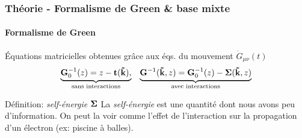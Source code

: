 \begin{frame}
    \frametitle{Théorie - Formalisme de Green \& base mixte}
    \framesubtitle{Formalisme de Green}
    Équations matricielles obtenues grâce aux éqs. du mouvement $\dot{G}_{\mu\nu}(t)$
    \begin{align}
      \underbrace{\vb{G}_0^{-1}(z) = z - \vb{t}(\vb{\tilde{k}}),}_{\text{sans interactions}}
        &&\underbrace{\vb{G}^{-1}(\vb{\Tilde{k}}, z) = \vb{G}_0^{-1}(z) - \vb{\Sigma}(\vb{\Tilde{k}}, z)}_{\text{avec interactions}}
        \label{eq: greens}
    \end{align}
    \vfill
    \pause
    \begin{defblock}{Définition: \textit{self-énergie} $\vb{\Sigma}$}
      La \textit{self-énergie} est une quantité dont nous avons peu d'information.
      On peut la voir comme l'effet de l'interaction sur la propagation d'un électron (ex: piscine à balles).
    \end{defblock}
\end{frame}
